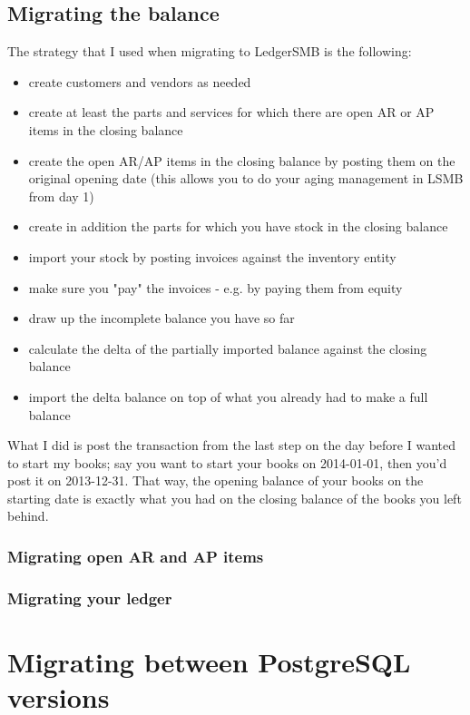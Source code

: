 \subsection{Migrating the balance}

The strategy that I used when migrating to LedgerSMB is the following:

\begin{itemize}
\item create customers and vendors as needed
\item create at least the parts and services for which there are open AR or AP items in the closing balance
\item create the open AR/AP items in the closing balance by posting them on the original opening date (this allows you to do your aging management in LSMB from day 1)
\item create in addition the parts for which you have stock in the closing balance
\item import your stock by posting invoices against the inventory entity
\item make sure you "pay" the invoices - e.g. by paying them from equity
\item draw up the incomplete balance you have so far
\item calculate the delta of the partially imported balance against the closing balance
\item import the delta balance on top of what you already had to make a full balance
\end{itemize}


What I did is post the transaction from the last step on the day before I wanted to start my books; say you want to start your books on 2014-01-01, then you'd post it on 2013-12-31. That way, the opening balance of your books on the starting date is exactly what you had on the closing balance of the books you left behind.

\subsubsection{Migrating open AR and AP items}
\label{subsec-migration-others-open-items}

\subsubsection{Migrating your ledger}
\label{subsec-migration-others-ledger}

\section{Migrating between PostgreSQL versions}
\label{sec-migration-postrgesql}

